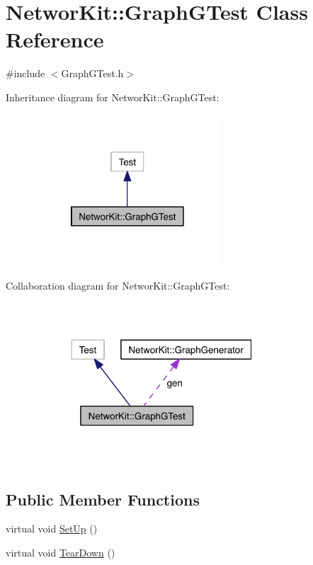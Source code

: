 \hypertarget{class_networ_kit_1_1_graph_g_test}{\section{Networ\-Kit\-:\-:Graph\-G\-Test Class Reference}
\label{class_networ_kit_1_1_graph_g_test}
}


{\ttfamily \#include $<$Graph\-G\-Test.\-h$>$}



Inheritance diagram for Networ\-Kit\-:\-:Graph\-G\-Test\-:\nopagebreak
\begin{figure}[H]
\begin{center}
\leavevmode
\includegraphics[width=198pt]{class_networ_kit_1_1_graph_g_test__inherit__graph}
\end{center}
\end{figure}


Collaboration diagram for Networ\-Kit\-:\-:Graph\-G\-Test\-:\nopagebreak
\begin{figure}[H]
\begin{center}
\leavevmode
\includegraphics[width=269pt]{class_networ_kit_1_1_graph_g_test__coll__graph}
\end{center}
\end{figure}
\subsection*{Public Member Functions}
\begin{DoxyCompactItemize}
\item 
virtual void \hyperlink{class_networ_kit_1_1_graph_g_test_a098ec8aecc22b520b365f7d165749892}{Set\-Up} ()
\item 
virtual void \hyperlink{class_networ_kit_1_1_graph_g_test_aff4225a04381a7048426bf0020da47a3}{Tear\-Down} ()
\end{DoxyCompactItemize}
